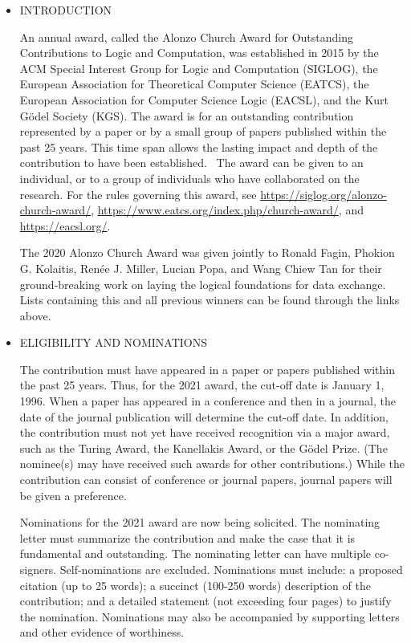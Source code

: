 \documentclass{article}
\begin{document}
\begin{itemize}\item  INTRODUCTION  
 
  An annual award, called the Alonzo Church Award for Outstanding Contributions to Logic and Computation, was established in 2015 by the ACM Special Interest Group for Logic and Computation (SIGLOG), the European Association for Theoretical Computer Science (EATCS), the European Association for Computer Science Logic (EACSL), and the Kurt Gödel Society (KGS). The award is for an outstanding contribution represented by a paper or by a small group of papers published within the past 25 years. This time span allows the lasting impact and depth of the contribution to have been established.  The award can be given to an individual, or to a group of individuals who have collaborated on the research. For the rules governing this award, see \href{https://siglog.org/alonzo-church-award/}{https://siglog.org/alonzo-church-award/}, \href{https://www.eatcs.org/index.php/church-award/}{https://www.eatcs.org/index.php/church-award/}, and \href{https://eacsl.org/}{https://eacsl.org/}.  
 
  The 2020 Alonzo Church Award was given jointly to Ronald Fagin, Phokion G. Kolaitis, Renée J. Miller, Lucian Popa, and Wang Chiew Tan for their ground-breaking work on laying the logical foundations for data exchange. Lists containing this and all previous winners can be found through the links above.  
 
\item  ELIGIBILITY AND NOMINATIONS 
 
  The contribution must have appeared in a paper or papers published within the past 25 years. Thus, for the 2021 award, the cut-off date is January 1, 1996. When a paper has appeared in a conference and then in a journal, the date of the journal publication will determine the cut-off date. In addition, the contribution must not yet have received recognition via a major award, such as the Turing Award, the Kanellakis Award, or the Gödel Prize. (The nominee(s) may have received such awards for other contributions.) While the contribution can consist of conference or journal papers, journal papers will be given a preference. 
 
  Nominations for the 2021 award are now being solicited. The nominating letter must summarize the contribution and make the case that it is fundamental and outstanding. The nominating letter can have multiple co-signers. Self-nominations are excluded. Nominations must include: a proposed citation (up to 25 words); a succinct (100-250 words) description of the contribution; and a detailed statement (not exceeding four pages) to justify the nomination. Nominations may also be accompanied by supporting letters and other evidence of worthiness. 
 

\end{itemize}
\end{document}
